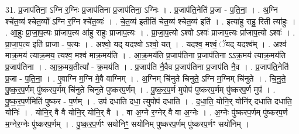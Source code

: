 \documentclass[17pt]{extarticle}
\begin{document}
31. प्र॒जाप॑तिना॒ ऽग्नि र॒ग्निः प्र॒जाप॑तिना प्र॒जाप॑तिना॒ ऽग्निः । . प्र॒जाप॑ति॒नेति॑ प्र॒जा - प॒ति॒ना॒ । . अ॒ग्नि श्चे॑त॒व्य॑ श्चेत॒व्यो᳚ ऽग्नि र॒ग्नि श्चे॑त॒व्यः॑ । . चे॒त॒व्य॑ इतीति॑ चेत॒व्य॑ श्चेत॒व्य॑ इति॑ । . इत्या॑हु राहु॒ रिती त्या॑हुः । . आ॒हुः॒ प्रा॒जा॒प॒त्यः प्रा॑जाप॒त्य आ॑हु राहुः प्राजाप॒त्यः । . प्रा॒जा॒प॒त्यो ऽश्वो ऽश्वः॑ प्राजाप॒त्यः प्रा॑जाप॒त्यो ऽश्वः॑ । . प्रा॒जा॒प॒त्य इति॑ प्राजा - प॒त्यः । . अश्वो॒ यद् यदश्वो ऽश्वो॒ यत् । . यदश्व॒ मश्वं॒ ॅयद् यदश्व᳚म् । . अश्व॑ माक्र॒मय॑ त्याक्र॒मय॒ त्यश्व॒ मश्व॑ माक्र॒मय॑ति । . आ॒क्र॒मय॑ति प्र॒जाप॑तिना प्र॒जाप॑तिना ऽऽक्र॒मय॑ त्याक्र॒मय॑ति प्र॒जाप॑तिना । . आ॒क्र॒मय॒तीत्या᳚ - क्र॒मय॑ति । . प्र॒जाप॑ति नै॒वैव प्र॒जाप॑तिना प्र॒जाप॑ति नै॒व । . प्र॒जाप॑ति॒नेति॑ प्र॒जा - प॒ति॒ना॒ । . ए॒वाग्नि म॒ग्नि मे॒वै वाग्निम् । . अ॒ग्निम् चि॑नुते चिनुते॒ ऽग्नि म॒ग्निम् चि॑नुते । . चि॒नु॒ते॒ पु॒ष्क॒र॒प॒र्णम् पु॑ष्करप॒र्णम् चि॑नुते चिनुते पुष्करप॒र्णम् । . पु॒ष्क॒र॒प॒र्ण मुपोप॑ पुष्करप॒र्णम् पु॑ष्करप॒र्ण मुप॑ । . पु॒ष्क॒र॒प॒र्णमिति॑ पुष्कर - प॒र्णम् । . उप॑ दधाति दधा॒ त्युपोप॑ दधाति । . द॒धा॒ति॒ योनि॒र् योनि॑र् दधाति दधाति॒ योनिः॑ । . योनि॒र् वै वै योनि॒र् योनि॒र् वै । . वा अ॒ग्ने र॒ग्नेर् वै वा अ॒ग्नेः । . अ॒ग्नेः पु॑ष्करप॒र्णम् पु॑ष्करप॒र्ण म॒ग्नेर॒ग्नेः पु॑ष्करप॒र्णम् । . पु॒ष्क॒र॒प॒र्णꣳ सयो॑निꣳ॒॒ सयो॑निम् पुष्करप॒र्णम् पु॑ष्करप॒र्णꣳ सयो॑निम् । \newline
\end{document}

